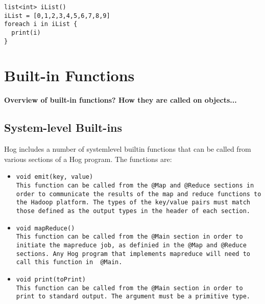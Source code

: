 \documentclass{book}
\begin{document}
\begin{verbatim}
list<int> iList()
iList = [0,1,2,3,4,5,6,7,8,9]
foreach i in iList {
  print(i)
}
\end{verbatim}




\chapter{Built-in Functions} %
\label{cha:built_in_functions}

\textbf{Overview of built-in functions? How they are called on objects...}

\section{System-level Built-ins} %
\label{sec:system_level_built_ins}

Hog includes a number of system­level built­in functions that can be called from
various sections of a Hog program. The functions are:

\begin{itemize} 

\item[] \tt void emit(key, value) \rm \\

This function can be called from the \tt @Map \rm and \tt @Reduce \rm sections in
order to communicate the results of the map and reduce functions to the Hadoop
platform. The types of the key/value pairs must match those defined as the output
types in the header of each section.

\item[] \tt void mapReduce() \rm \\

This function can be called from the \tt @Main \rm section in order to initiate the
mapreduce job, as definied in the \tt @Map \rm and \tt @Reduce \rm sections. Any
Hog program that implements mapreduce will need to call this function in \tt
@Main\rm.

\item[] \tt void print(toPrint) \rm \\

This function can be called from the \tt @Main \rm section in order to print to
standard output. The argument must be a primitive type.

\end{itemize}
\end{document}
